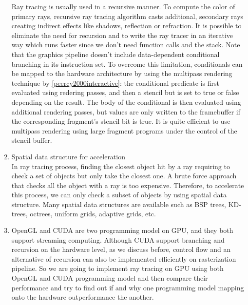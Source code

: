 \begin{enumerate}
    Ray tracing is usually used in a recursive manner. To compute the color of primary rays, recursive ray tracing algorithm casts additional, secondary rays creating indirect effects like shadows, reflection or refraction. It is possible to eliminate the need for recursion and to write the ray tracer in an iterative way which runs faster since we don't need function calls and the stack. Note that the graphics pipeline doesn't include data-dependent conditional branching in its instruction set. To overcome this limitation, conditionals can be mapped to the hardware architecture by using the multipass rendering technique by \ref{peercy2000interactive}: the conditional predicate is first evaluated using redering passes, and then a stencil but is set to true or false depending on the result. The body of the conditional is then evaluated using additional rendering passes, but values are only written to the framebuffer if the corresponding fragment's stencil bit is true. It is quite efficient to use multipass rendering using large fragment programs under the control of the stencil buffer.
    \item Spatial data structure for acceleration\\
    In ray tracing process, finding the closest object hit by a ray requiring to check a set of objects but only take the closest one. A brute force approach that checks all the object with a ray is too expensive. Therefore, to accelerate this process, we can only check a subset of objects by using spatial data structure. Many spatial data structures are available such as BSP trees, KD-trees, octrees, uniform grids, adaptive grids, etc. 
    \item OpenGL and CUDA are two programming model on GPU, and they both support streaming computing. Although CUDA support branching and recursion on the hardware level, as we discuss before, control flow and an alternative of recursion can also be implemented efficiently on rasterization pipeline. So we are going to implement ray tracing on GPU using both OpenGL and CUDA programming model and then compare their performance and try to find out if and why one programming model mapping onto the hardware outperformance the another. 
    
\end{enumerate}
